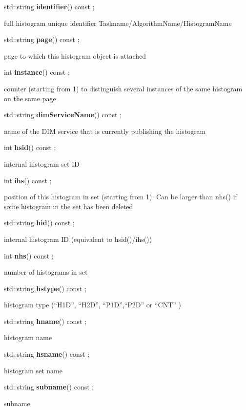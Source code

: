 \item    std::string {\bf identifier}() const ;

 full histogram unique identifier Taskname/AlgorithmName/HistogramName


\item    std::string {\bf page}() const ;

 page to which this histogram object is attached


\item    int {\bf instance}() const ;

 counter (starting from 1) to distinguish several instances of the same histogram on the same page


\item    std::string {\bf dimServiceName}() const  ;

 name of the DIM service that is currently publishing the histogram


\item    int {\bf hsid}() const ;

 internal histogram set ID


\item    int {\bf ihs}() const ;

 position of this histogram in set (starting from 1). Can be larger than nhs() if some histogram in the set has been deleted


\item    std::string {\bf hid}() const ;

 internal histogram ID (equivalent to hsid()/ihs())


\item    int {\bf nhs}() const ;

 number of histograms in set


\item    std::string {\bf hstype}() const ;

 histogram type (``H1D'', ``H2D'', ``P1D'',``P2D'' or ``CNT'' )


\item    std::string {\bf hname}() const ;

 histogram name


\item    std::string {\bf hsname}() const ;

 histogram set name


\item    std::string {\bf subname}() const ;

 subname


